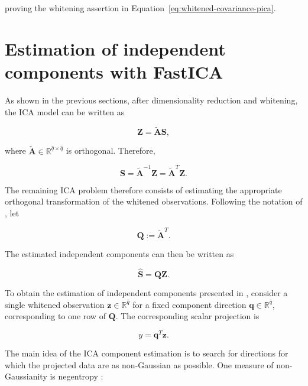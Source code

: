 \documentclass[english]{pwr_wmat_praca_dyplomowa}
\theoremstyle{definition}
\theoremstyle{remark}
\begin{document}
proving the whitening assertion in Equation~\eqref{eq:whitened-covariance-pica}.


\section{Estimation of independent components with FastICA}

As shown in the previous sections, after dimensionality reduction and whitening, the ICA model can be written as

\begin{equation}
    \mathbf{Z} = \widetilde{\mathbf{A}}\mathbf{S},
\end{equation}

where $\widetilde{\mathbf{A}} \in \mathbb{R}^{\widehat{q}\times \widehat{q}}$ is orthogonal. Therefore,

\begin{equation}
    \mathbf{S} = \widetilde{\mathbf{A}}^{-1} \mathbf{Z} = \widetilde{\mathbf{A}}^T \mathbf{Z}.
\end{equation}

The remaining ICA problem therefore consists of estimating the appropriate orthogonal transformation of the whitened observations. Following the notation of \cite{pica}, let

\begin{equation}
    \mathbf{Q} := \widetilde{\mathbf{A}}^T.
    \label{eq:q-orthogonal}
\end{equation}

The estimated independent components can then be written as

\begin{equation}
    \widehat{\mathbf{S}} = \mathbf{Q}\mathbf{Z}.
    \label{eq:estimated-ics}
\end{equation}

To obtain the estimation of independent components presented in \cite[Section 8.4]{ica}, consider a single whitened observation $\mathbf{z} \in \mathbb{R}^{\widehat{q}}$ for a fixed component direction $\mathbf{q} \in \mathbb{R}^{\widehat{q}}$, corresponding to one row of $\mathbf{Q}$. The corresponding scalar projection is 

\begin{equation}
    y = \mathbf{q}^T \mathbf{z}.
    \label{eq:scalar-projection}
\end{equation}

The main idea of the ICA component estimation is to search for directions for which the projected data are as non-Gaussian as possible. One measure of non-Gaussianity is negentropy \cite[Equation 8.22]{ica}:
\end{document}
